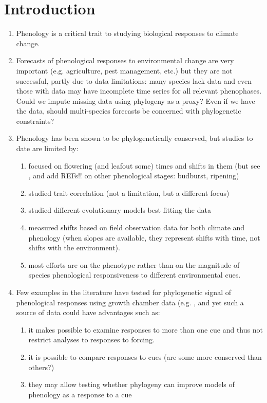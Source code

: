 \documentclass{article}\usepackage[]{graphicx}\usepackage[]{color}
\begin{document}
\section*{Introduction}
\begin{enumerate}
\item Phenology is a critical trait to studying biological responses to climate change.
\item Forecasts of phenological responses to environmental change are very important (e.g. agriculture, pest management, etc.) but they are not successful, partly due to data limitations: many species lack data and even those with data may have incomplete time series for all relevant phenophases. Could we impute missing data using phylogeny as a proxy? Even if we have the data, should multi-species forecasts be concerned with phylogenetic constraints? 
\item Phenology has been shown to be phylogenetically conserved, but studies to date are limited by:
\begin{enumerate}
\item focused on flowering (and leafout some) times and shifts in them (but see \cite{joly2019importance}, and add REFs!! on other phenological stages: budburst, ripening)
\item studied trait correlation \citep{bolmgren2008time} (not a limitation, but a different focus)
\item studied different evolutionary models best fitting the data \citep{rafferty2017global}
\item measured shifts based on field observation data for both climate and phenology (when slopes are available, they represent shifts with time, not shifts with the environment).
\item most efforts are on the phenotype rather than on the magnitude of species phenological responsiveness to different environmental cues.
\end{enumerate}
\item Few examples in the literature have tested for phylogenetic signal of phenological responses using growth chamber data (e.g. \cite{joly2019importance}, and yet such a source of data could have advantages such as:
\begin{enumerate}
\item it makes possible to examine responses to more than one cue and thus not restrict analyses to responses to forcing.
\item it is possible to compare responses to cues (are some more conserved than others?) 
\item they may allow testing whether phylogeny can improve models of phenology as a response to a cue
\end{enumerate}


\end{enumerate}
\end{document}
